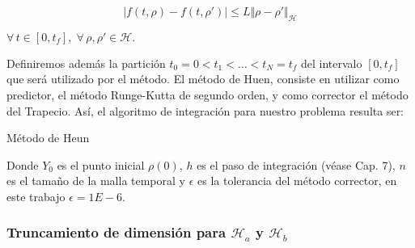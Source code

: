 $$\vert f(t,\rho)-f(t,\rho')\vert\leq L\Vert \rho-\rho'\Vert_\mathcal{H}$$

$\forall\, t\in[0,t_f],\; \forall\,\rho,\rho'\in\mathcal{H}.$

\quad Definiremos adem\'as la partici\'on $t_0=0<t_1<\ldots<t_N=t_f$ del intervalo $[0,t_f]$ que ser\'a utilizado por el m\'etodo. El m\'etodo de Huen, consiste en utilizar como predictor, el m\'etodo Runge-Kutta de segundo orden, y como corrector el m\'etodo del Trapecio. As\'i, el algoritmo de integraci\'on para nuestro problema resulta ser:

\begin{algorithm}[H]
\caption{M\'etodo de Heun}\label{algo:heun}
\LinesNumbered
{}
\end{algorithm}

\quad Donde $Y_0$ es el punto inicial $\rho(0)$, $h$ es el paso de integraci\'on (v\'ease \cite{gino} Cap. 7), $n$ es el tama\~no de la malla temporal y $\epsilon$ es la tolerancia del m\'etodo corrector, en este trabajo $\epsilon=1E-6$.

\subsubsection{Truncamiento de dimensi\'on para $\mathcal{H}_a$ y $\mathcal{H}_b$}